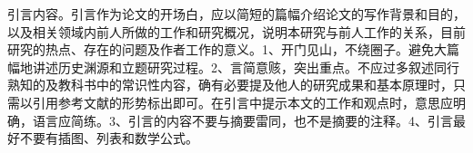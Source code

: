 \documentclass[10pt,a4paper,twoside]{article}
\numberwithin{figure}{section}%
\numberwithin{table}{section}%
\begin{document}

\par{引言内容。引言作为论文的开场白，应以简短的篇幅介绍论文的写作背景和目的，以及相关领域内前人所做的工作和研究概况，说明本研究与前人工作的关系，目前研究的热点、存在的问题及作者工作的意义。1、开门见山，不绕圈子。避免大篇幅地讲述历史渊源和立题研究过程。2、言简意赅，突出重点。不应过多叙述同行熟知的及教科书中的常识性内容，确有必要提及他人的研究成果和基本原理时，只需以引用参考文献的形势标出即可。在引言中提示本文的工作和观点时，意思应明确，语言应简练。3、引言的内容不要与摘要雷同，也不是摘要的注释。4、引言最好不要有插图、列表和数学公式。}
\end{document}
